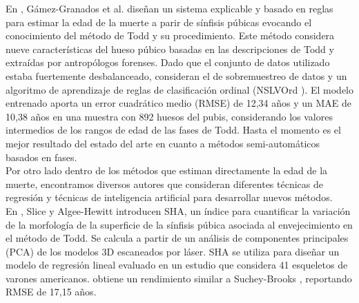 En \cite{gámez_irurita_gonzález_damas_alemán_cordón_2021}, Gámez-Granados et al. diseñan un sistema explicable y basado en reglas para estimar la edad de la muerte a parir de sínfisis púbicas evocando el conocimiento del método de Todd y su procedimiento. Este método considera nueve características del hueso púbico basadas en las descripciones de Todd y extraídas por antropólogos forenses. Dado que el conjunto de datos utilizado estaba fuertemente desbalanceado, consideran el de sobremuestreo de datos y un algoritmo de aprendizaje de reglas de clasificación ordinal (NSLVOrd \cite{gamez2016ordinal}). El modelo entrenado aporta un error cuadrático medio (RMSE) de 12,34 años y un MAE de 10,38 años en una muestra con 892 huesos del pubis, considerando los valores intermedios de los rangos de edad de las fases de Todd. Hasta el momento es el mejor resultado del estado del arte en cuanto a métodos semi-automáticos basados en fases.\\

Por otro lado dentro de los métodos que estiman directamente la edad de la muerte, encontramos diversos autores que consideran diferentes técnicas de regresión y técnicas de inteligencia artificial para desarrollar nuevos métodos.\\

En \cite{slice2015modeling}, Slice y Algee-Hewitt introducen SHA, un índice para cuantificar la variación de la morfología de la superficie de la sínfisis púbica asociada al envejecimiento en el método de Todd. Se calcula a partir de un análisis de componentes principales (PCA) de los modelos 3D escaneados por láser. SHA se utiliza para diseñar un modelo de regresión lineal evaluado en un estudio que considera 41 esqueletos de varones americanos. \cite{slice2015modeling} obtiene un rendimiento similar a Suchey-Brooks \cite{brooks1990skeletal}, reportando RMSE de 17,15 años.\\ %

